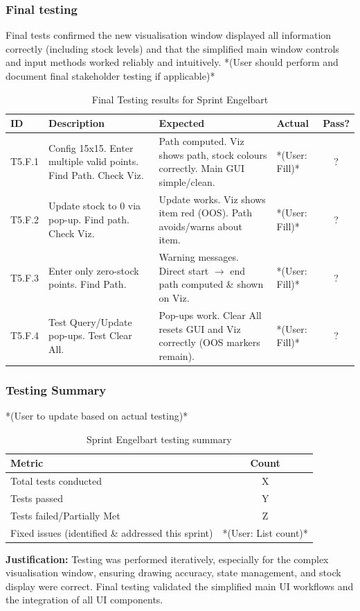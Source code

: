 \subsubsection{Final testing}
Final tests confirmed the new visualisation window displayed all information correctly (including stock levels) and that the simplified main window controls and input methods worked reliably and intuitively.
*(User should perform and document final stakeholder testing if applicable)*

\begin{table}[htbp] %
	\centering
	\begin{tabularx}{\textwidth}{|l|X|p{3.5cm}|p{3.5cm}|c|}
		\hline
		\textbf{ID} & \textbf{Description} & \textbf{Expected} & \textbf{Actual} & \textbf{Pass?} \\
		\hline
		T5.F.1 & Config 15x15. Enter multiple valid points. Find Path. Check Viz. & Path computed. Viz shows path, stock colours correctly. Main GUI simple/clean. & *(User: Fill)* & ? \\
		\hline
		T5.F.2 & Update stock to 0 via pop-up. Find path. Check Viz. & Update works. Viz shows item red (OOS). Path avoids/warns about item. & *(User: Fill)* & ? \\
		\hline
		T5.F.3 & Enter only zero-stock points. Find Path. & Warning messages. Direct start $ \rightarrow $ end path computed \& shown on Viz. & *(User: Fill)* & ? \\
		\hline
		T5.F.4 & Test Query/Update pop-ups. Test Clear All. & Pop-ups work. Clear All resets GUI and Viz correctly (OOS markers remain). & *(User: Fill)* & ? \\
		\hline
	\end{tabularx}
	\caption{Final Testing results for Sprint Engelbart}
\end{table}

\newpage

\subsubsection{Testing Summary}
*(User to update based on actual testing)*
\begin{table}[htbp]
	\centering
	\begin{tabular}{|l|c|}
		\hline
		\textbf{Metric} & \textbf{Count} \\
		\hline
		Total tests conducted & X \\ %
		\hline
		Tests passed & Y \\
		\hline
		Tests failed/Partially Met & Z \\
		\hline
		Fixed issues (identified \& addressed this sprint) & *(User: List count)* \\
		\hline
	\end{tabular}
	\caption{Sprint Engelbart testing summary}
\end{table}
\textbf{Justification:} Testing was performed iteratively, especially for the complex visualisation window, ensuring drawing accuracy, state management, and stock display were correct. Final testing validated the simplified main UI workflows and the integration of all UI components.

